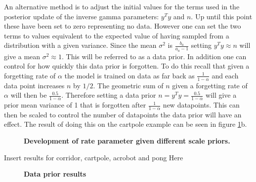 An alternative method is to adjust the initial values for the terms used in the posterior update of the inverse gamma parameters: $y^Ty$ and $n$. Up until this point these have been set to zero representing no data. However one can set the two terms to values equivalent to the expected value of having sampled from a distribution with a given variance. Since the mean $\sigma^2$ is $\frac{b_a}{a_a-1}$ setting $y^Ty\approx n$ will give a mean $\sigma^2\approx 1$. This will be referred to as a data prior. In addition one can control for how quickly this data prior is forgotten. To do this recall that given a forgetting rate of $\alpha$ the model is trained on data as far back as $\frac{1}{1-\alpha}$ and each data point increases $n$ by $1/2$. The geometric sum of $n$ given a forgetting rate of $\alpha$ will then be $\frac{0.5}{1-\alpha}$. Therefore setting a data prior $n=y^Ty=\frac{0.5}{1-\alpha}$ will give a prior mean variance of 1 that is forgotten after $\frac{1}{1-\alpha}$ new datapoints. This can then be scaled to control the number of datapoints the data prior will have an effect. The result of doing this on the cartpole example can be seen in figure \ref{fig:scale_stability2}b.

\begin{figure}[H]
    \centering
    \caption{\textbf{Development of rate parameter given different scale priors.}}
    \label{fig:scale_stability2}
\end{figure}

\todo Insert results for corridor, cartpole, acrobot and pong Here

\begin{figure}[H] 
    \centering 
    \caption{\textbf{Data prior results}} 
    \label{fig:high_scale} 
\end{figure}

\cleardoublepage
